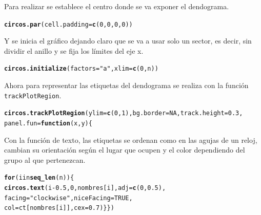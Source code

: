\documentclass{article}\usepackage[]{graphicx}\usepackage[]{color}
\makeatletter
\newcommand{\hlnum}[1]{\textcolor[rgb]{0.686,0.059,0.569}{#1}}%
\newcommand{\hlstr}[1]{\textcolor[rgb]{0.192,0.494,0.8}{#1}}%
\newcommand{\hlstd}[1]{\textcolor[rgb]{0.345,0.345,0.345}{#1}}%
\newcommand{\hlkwc}[1]{\textcolor[rgb]{0.333,0.667,0.333}{#1}}%
\newcommand{\hlkwd}[1]{\textcolor[rgb]{0.737,0.353,0.396}{\textbf{#1}}}%
\newenvironment{kframe}{%
 \def\at@end@of@kframe{}%
 \ifinner\ifhmode%
  \def\at@end@of@kframe{\end{minipage}}%
  \begin{minipage}{\columnwidth}%
 \fi\fi%
 \def\FrameCommand##1{\hskip\@totalleftmargin \hskip-\fboxsep
 \colorbox{shadecolor}{##1}\hskip-\fboxsep
     \hskip-\linewidth \hskip-\@totalleftmargin \hskip\columnwidth}%
 \MakeFramed {\advance\hsize-\width
   \@totalleftmargin\z@ \linewidth\hsize
   \@setminipage}}%
 {\par\unskip\endMakeFramed%
 \at@end@of@kframe}
\newenvironment{knitrout}{}{} %
\makeatother
\begin{document}
Para realizar se establece el centro donde se va exponer el dendograma.
\begin{knitrout}
\color{fgcolor}\begin{kframe}
\begin{alltt}
\hlkwd{circos.par}\hlstd{(}\hlkwc{cell.padding} \hlstd{=} \hlkwd{c}\hlstd{(}\hlnum{0}\hlstd{,} \hlnum{0}\hlstd{,} \hlnum{0}\hlstd{,} \hlnum{0}\hlstd{))}
\end{alltt}
\end{kframe}
\end{knitrout}
Y se inicia el gr\'afico dejando claro que se va a usar solo un sector, es decir, sin dividir el anillo y se fija los l\'imites del eje x.
\begin{knitrout}
\color{fgcolor}\begin{kframe}
\begin{alltt}
\hlkwd{circos.initialize}\hlstd{(}\hlkwc{factors} \hlstd{=} \hlstr{"a"}\hlstd{,} \hlkwc{xlim} \hlstd{=} \hlkwd{c}\hlstd{(}\hlnum{0}\hlstd{, n))}
\end{alltt}
\end{kframe}
\end{knitrout}
\clearpage
Ahora para representar las etiquetas del dendograma se realiza con la funci\'on \texttt{trackPlotRegion}.
\begin{knitrout}
\color{fgcolor}\begin{kframe}
\begin{alltt}
\hlkwd{circos.trackPlotRegion}(ylim = \hlkwd{c}(0, 1), bg.border = NA, track.height = 0.3,
                       panel.fun = \hlkwd{function}(x, y) \{
\end{alltt}
\end{kframe}
\end{knitrout}
Con la funci\'on de texto, las etiquetas se ordenan como en las agujas de un reloj, cambian su orientaci\'on seg\'un el lugar que ocupen y el color dependiendo del grupo al que pertenezcan.
\begin{knitrout}
\color{fgcolor}\begin{kframe}
\begin{alltt}
                         \hlkwd{for}(i in \hlkwd{seq_len}(n)) \{
                           \hlkwd{circos.text}(i-0.5, 0, nombres[i], adj = \hlkwd{c}(0, 0.5),
                                       facing = \hlstr{"clockwise"}, niceFacing = TRUE,
                                       col = ct[nombres[i]], cex = 0.7)\}\})
\end{alltt}
\end{kframe}
\end{knitrout}
\end{document}
